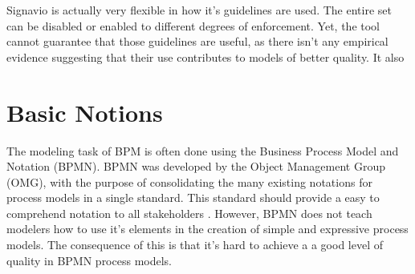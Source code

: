 \documentclass{llncs}
\begin{document}
Signavio is actually very flexible in how it's guidelines are used. The entire set can be disabled or enabled to different degrees of enforcement. Yet, the tool cannot guarantee that those guidelines are useful, as there isn't any empirical evidence suggesting that their use contributes to models of better quality. It also 

\section{Basic Notions}\label{Fundamentals}\label{Background}

The modeling task of BPM is often done using the Business Process Model and Notation (BPMN). BPMN was developed by the Object Management Group (OMG), with the purpose of consolidating the many existing notations for process models in a single standard. This standard should provide a easy to comprehend notation to all stakeholders \cite{OMGObjectManagementGroup2015}. However, BPMN does not teach modelers how to use it's elements in the creation of simple and expressive process models. %
The consequence of this is that it's hard to achieve a a good level of quality in BPMN process models.




\end{document}
